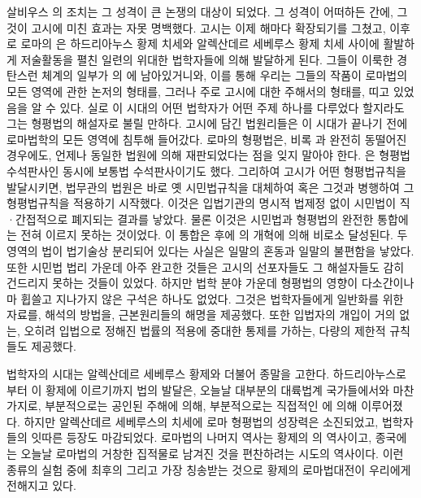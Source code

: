 살비우스 의 조치는 그 성격이 큰 논쟁의 대상이 되었다.
그 성격이 어떠하든 간에, 그것이 고시에 미친 효과는 자못 명백했다.
고시는 이제 해마다 확장되기를 그쳤고, 이후로
로마의 은 하드리아누스 황제 치세와 알렉산데르 세베루스 황제 치세 사이에
활발하게 저술활동을 펼친 일련의 위대한 법학자들에 의해 발달하게 된다.
그들이 이룩한 경탄스런 체계의 일부가
의 에
남아있거니와, 이를 통해 우리는 그들의 작품이 로마법의 모든 영역에 관한
논저의 형태를,
그러나 주로 고시에 대한 주해서의 형태를, 띠고 있었음을 알 수 있다.
실로 이 시대의 어떤 법학자가 어떤 주제 하나를 다루었다 할지라도
그는 형평법의 해설자로 불릴 만하다.
고시에 담긴 법원리들은 이 시대가 끝나기 전에 로마법학의 모든 영역에
침투해 들어갔다.
로마의 형평법은, 비록 과 완전히 동떨어진 경우에도,
언제나 동일한 법원에 의해 재판되었다는 점을 잊지 말아야 한다.
은 형평법 수석판사인 동시에 보통법 수석판사이기도 했다.
그리하여 고시가 어떤 형평법규칙을 발달시키면,
법무관의 법원은 바로 옛 시민법규칙을 대체하여 혹은 그것과 병행하여
그 형평법규칙을 적용하기 시작했다. 이것은
입법기관의 명시적 법제정 없이 시민법이 직^^b7간접적으로 폐지되는 결과를 낳았다.
물론 이것은 시민법과 형평법의 완전한 통합에는 전혀 이르지 못하는 것이었다.
이 통합은 후에 의 개혁에 의해 비로소 달성된다.
두 영역의 법이 법기술상 분리되어 있다는 사실은
일말의 혼동과 일말의 불편함을 낳았다. 또한
시민법 법리 가운데 아주 완고한 것들은 고시의 선포자들도 그 해설자들도
감히 건드리지 못하는 것들이 있었다.
하지만 법학 분야 가운데
형평법의 영향이 다소간이나마 휩쓸고 지나가지 않은 구석은 하나도 없었다.
그것은 법학자들에게 일반화를 위한 자료를,
해석의 방법을, 근본원리들의 해명을 제공했다. 또한
입법자의 개입이 거의 없는,
오히려 입법으로 정해진 법률의 적용에 중대한 통제를 가하는,
다량의 제한적 규칙들도 제공했다.

법학자의 시대는 알렉산데르 세베루스 황제와 더불어 종말을 고한다.
하드리아누스로부터 이 황제에 이르기까지 법의 발달은,
오늘날 대부분의 대륙법계 국가들에서와 마찬가지로,
부분적으로는 공인된 주해에 의해,
부분적으로는 직접적인 에 의해 이루어졌다.
하지만 알렉산데르 세베루스의 치세에 로마 형평법의 성장력은 소진되었고,
법학자들의 잇따른 등장도 마감되었다.
로마법의 나머지 역사는 황제의 의 역사이고,
종국에는 오늘날 로마법의 거창한 집적물로 남겨진 것을 편찬하려는
시도의 역사이다.
이런 종류의 실험 중에 최후의 그리고 가장 칭송받는 것으로
 황제의 로마법대전이 우리에게 전해지고 있다.

